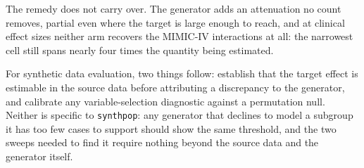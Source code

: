 \documentclass[11pt]{article}
\begin{document}
The remedy does not carry over. The generator adds an attenuation no count
removes, partial even where the target is large enough to reach, and at clinical
effect sizes neither arm recovers the MIMIC-IV interactions at all: the narrowest
cell still spans nearly four times the quantity being estimated.

For synthetic data evaluation, two things follow: establish that the target
effect is estimable in the source data before attributing a discrepancy to the
generator, and calibrate any variable-selection diagnostic against a permutation
null. Neither is specific to \texttt{synthpop}: any generator that declines to
model a subgroup it has too few cases to support should show the same threshold,
and the two sweeps needed to find it require nothing beyond the source data and
the generator itself.
\end{document}
